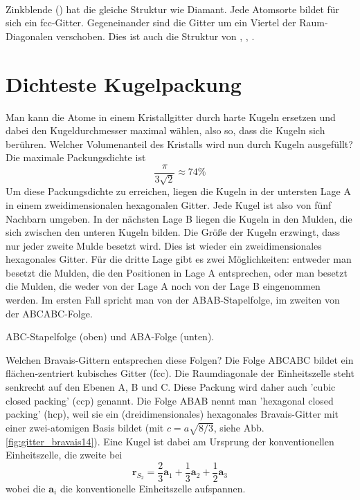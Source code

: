 \paragraph{} Zinkblende () hat die gleiche Struktur wie Diamant. Jede Atomsorte bildet für sich ein fcc-Gitter. Gegeneinander sind die Gitter um ein Viertel der Raum-Diagonalen verschoben. Dies ist auch die Struktur von , , .


\section{Dichteste Kugelpackung}

Man kann die Atome in einem Kristallgitter durch harte Kugeln ersetzen und dabei den Kugeldurchmesser maximal wählen, also so, dass die Kugeln sich berühren. Welcher Volumenanteil des Kristalls wird nun durch Kugeln ausgefüllt? Die maximale Packungsdichte ist 
\begin{equation}
 \frac{\pi}{3 \sqrt{2}} \approx 74 \%
\end{equation}
Um diese Packungsdichte zu erreichen, liegen die Kugeln in der untersten Lage A in einem zweidimensionalen hexagonalen Gitter. Jede Kugel ist also von fünf Nachbarn umgeben. In der nächsten Lage B liegen die Kugeln in den Mulden, die sich zwischen den unteren Kugeln bilden.  Die Größe der Kugeln erzwingt, dass nur jeder zweite Mulde besetzt wird.
Dies ist wieder ein zweidimensionales hexagonales Gitter. Für die dritte Lage gibt es zwei Möglichkeiten: entweder man besetzt die Mulden, die den Positionen in Lage A entsprechen, oder man besetzt die Mulden, die weder von der Lage A noch von der Lage B eingenommen werden. Im ersten Fall spricht man von der ABAB-Stapelfolge, im zweiten von der ABCABC-Folge.

\begin{marginfigure}

\caption{ABC-Stapelfolge (oben) und ABA-Folge (unten).}
\end{marginfigure}


Welchen Bravais-Gittern entsprechen diese Folgen?  Die Folge ABCABC bildet ein flächen-zentriert kubisches Gitter (fcc).  Die Raumdiagonale der  Einheitszelle steht senkrecht auf den Ebenen A, B und C. Diese Packung wird daher auch 'cubic closed packing' (ccp) genannt. Die Folge ABAB nennt man  'hexagonal closed packing' (hcp), weil sie ein (dreidimensionales) hexagonales Bravais-Gitter mit einer zwei-atomigen Basis bildet (mit $c=a \sqrt{8/3}$, siehe Abb. \ref{fig:gitter_bravais14}). Eine Kugel ist dabei am Ursprung der konventionellen Einheitszelle, die zweite bei 
\begin{equation}
 \mathbf{r}_{S_2} =  \frac{2}{3}  \mathbf{a}_1 + \frac{1}{3}  \mathbf{a}_2 + \frac{1}{2}  \mathbf{a}_3  
\end{equation}
 wobei die $\mathbf{a}_i$ die konventionelle Einheitszelle aufspannen.

